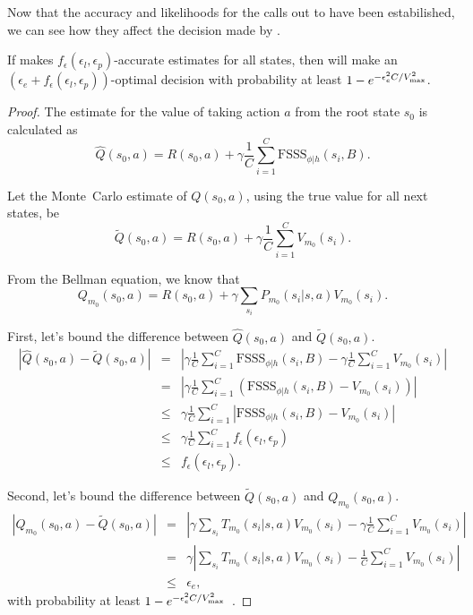 Now that the accuracy and likelihoods for the calls out to  have been estabilished, we can see how they affect the decision made by .

\begin{lemma}
If  makes $f_\epsilon(\epsilon_l,\epsilon_p)$-accurate estimates for all states, then  will make an $(\epsilon_e+f_\epsilon(\epsilon_l,\epsilon_p))$-optimal decision with probability at least $1-e^{-\epsilon_e^2 C / {V_{\rm max}^2}}$.
\end{lemma}

\begin{proof}

The estimate for the value of taking action $a$ from the root state $s_0$ is calculated as
\begin{equation}
\hat Q(s_0, a) = R(s_0,a) + \gamma \frac 1 C \sum_{i=1}^C \mbox{FSSS}_{\phi|h}(s_i, B).
\end{equation}

Let the Monte~Carlo estimate of $Q(s_0,a)$, using the true value for all next states, be
\begin{equation}
\tilde Q(s_0, a) = R(s_0,a) + \gamma \frac 1 C \sum_{i=1}^C V_{m_0}(s_i).
\end{equation}

From the Bellman equation, we know that
\begin{equation}
Q_{m_0}(s_0, a) = R(s_0,a) + \gamma \sum_{s_i} P_{m_0}(s_i|s,a) V_{m_0}(s_i).
\end{equation}

First, let's bound the difference between $\hat Q(s_0, a)$ and $\tilde Q(s_0, a)$.
\begin{eqnarray}
\nonumber |\hat Q(s_0, a) - \tilde Q(s_0, a)| &=& \left|\gamma \frac 1 C \sum_{i=1}^C \mbox{FSSS}_{\phi|h}(s_i, B) - \gamma \frac 1 C \sum_{i=1}^C V_{m_0}(s_i)\right|\\
\nonumber &=& \left|\gamma \frac 1 C \sum_{i=1}^C \left(\mbox{FSSS}_{\phi|h}(s_i, B) -  V_{m_0}(s_i)\right)\right|\\
\nonumber &\leq& \gamma \frac 1 C \sum_{i=1}^C \left|\mbox{FSSS}_{\phi|h}(s_i, B) -  V_{m_0}(s_i)\right|\\
\nonumber &\leq& \gamma \frac 1 C \sum_{i=1}^C f_\epsilon(\epsilon_l, \epsilon_p)\\
 &\leq& f_\epsilon(\epsilon_l, \epsilon_p).
\end{eqnarray}

Second, let's bound the difference between $\tilde Q(s_0, a)$ and $Q_{m_0}(s_0, a)$.
\begin{eqnarray}
\nonumber |Q_{m_0}(s_0, a) - \tilde Q(s_0, a)| &=& \left|\gamma \sum_{s_i} T_{m_0}(s_i|s,a)V_{m_0}(s_i) - \gamma \frac 1 C \sum_{i=1}^C V_{m_0}(s_i)\right|\\
\nonumber &=& \gamma \left|\sum_{s_i} T_{m_0}(s_i|s,a)V_{m_0}(s_i) - \frac 1 C \sum_{i=1}^C V_{m_0}(s_i)\right|\\
 &\leq& \epsilon_e,
\end{eqnarray}
with probability at least $1-e^{-\epsilon_e^2 C / {V_{\rm max}^2}}$~\cite{kearns99b}.


\end{proof}
